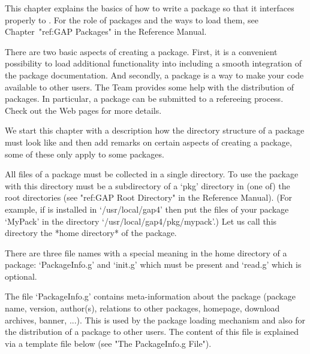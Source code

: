 

This chapter explains  the basics of how to write  a {\GAP} package so
that it interfaces properly to {\GAP}. For the role of {\GAP} packages
and  the ways  to load  them,  see Chapter~"ref:GAP  Packages" in  the
{\GAP} Reference Manual.

There are  two basic aspects of  creating a {\GAP} package.  First, it
is  a convenient  possibility  to load  additional functionality  into
{\GAP} including  a smooth  integration of the  package documentation.
And  secondly,  a  package  is  a way  to  make  your  code  available
to  other  {\GAP} users.  The  {\GAP}  Team  provides some  help  with
the  distribution  of  packages.  In  particular,  a  package  can  be
submitted  to a  refereeing process.  Check out  the {\GAP}  Web pages
 for more details.

We start this  chapter with a description how  the directory structure
of a  {\GAP} package must  look like and  then add remarks  on certain
aspects  of creating  a  package, some  of these  only  apply to  some
packages. 



All files of a {\GAP} package must be collected in a single directory.
To use the  package with {\GAP} this directory must  be a subdirectory
of a  `pkg' directory  in (one  of) the  {\GAP} root  directories (see
"ref:GAP Root  Directory" in the {\GAP} Reference Manual).
(For  example, if  {\GAP} is  installed in
`/usr/local/gap4' then put  the files of your package  `MyPack' in the
directory  `/usr/local/gap4/pkg/mypack'.) Let  us call  this directory
the *home directory* of the package.

There  are  three file  names  with  a  special  meaning in  the  home
directory of  a package:  `PackageInfo.g' and  `init.g' which  must be
present and `read.g' which is optional.

The file  `PackageInfo.g' contains meta-information about  the package
(package  name,  version,  author(s),  relations  to  other  packages,
homepage, download archives, banner, ...). This is used by the package
loading mechanism and also for the  distribution of a package to other
users. The  content of this file  is explained via a  template file 
below (see "The PackageInfo.g File").

